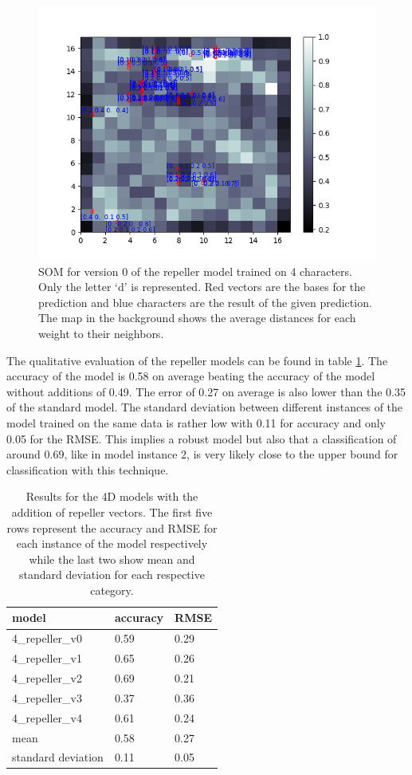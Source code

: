 \begin{figure}[!htb]
	\centering
	\includegraphics[width=\textwidth]{images/SOM_graphics/17x17_4d_repeller_v0/d.png}
	\caption{SOM for version 0 of the repeller model trained on 4 characters. Only the letter `d' is represented. Red vectors are the bases for the prediction and blue characters are the result of the given prediction. The map in the background shows the average distances for each weight to their neighbors.}
	\label{fig:4d_repeller_d}
\end{figure}

The qualitative evaluation of the repeller models can be found in table \ref{table:4_repeller}. The accuracy of the model is 0.58 on average beating the accuracy of the model without additions of 0.49. The error of 0.27 on average is also lower than the 0.35 of the standard model. The standard deviation between different instances of the model trained on the same data is rather low with 0.11 for accuracy and only 0.05 for the RMSE. This implies a robust model but also that a classification of around 0.69, like in model instance 2, is very likely close to the upper bound for classification with this technique. 

\begin{table}[!htb]
	\centering
	\caption{Results for the 4D models with the addition of repeller vectors. The first five rows represent the accuracy and RMSE for each instance of the model respectively while the last two show mean and standard deviation for each respective category.}
	\begin{tabularx}{\textwidth}{ X  X  X }
		\hline
		model & accuracy & RMSE \\ 
		\hline
		4\_repeller\_v0 & 0.59 & 0.29 \\ 
		4\_repeller\_v1 & 0.65 & 0.26 \\
		4\_repeller\_v2 & 0.69 & 0.21 \\ 
		4\_repeller\_v3 & 0.37 & 0.36 \\ 
		4\_repeller\_v4 & 0.61 & 0.24 \\
		\hline
		mean & 0.58 & 0.27\\
		standard deviation & 0.11 & 0.05 \\
		\hline
	\end{tabularx}
	\label{table:4_repeller}
\end{table}

